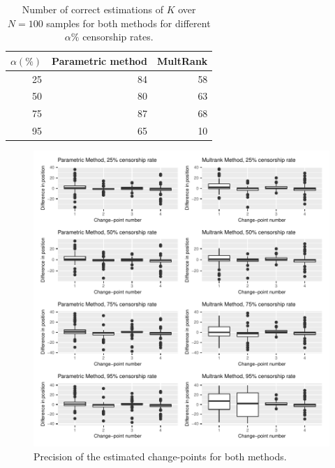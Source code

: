 \begin{itemize}
\begin{table}[ht]
\centering
\begin{tabular}{|r|r|r|}
  \hline
   $\alpha(\%)$  & Parametric method & MultRank \\ 
  \hline
 25 &  84 &  58 \\ 
 50 &  80 &  63 \\ 
 75 &  87 &  68 \\ 
 95 &  65 &  10 \\ 
   \hline
\end{tabular}
\caption{Number of correct estimations of $K$ over $N=100$ samples for both methods for different $\alpha\%$ censorship rates.}
\label{tab:simcomp}
\end{table}

\begin{figure}[ht]
    \centering
    \includegraphics{figs/Chap4/P_RUPT.pdf}
    \caption{Precision of the estimated change-points for both methods.}
    \label{fig:prec_sim}
\end{figure}

\end{itemize}
